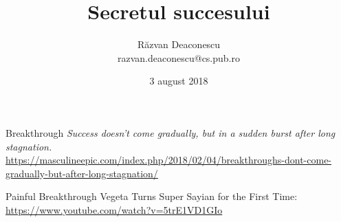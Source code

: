 \documentclass{beamer}
\title[Secretul succesului]{Secretul succesului}
\institute{InfoEducație 2018 (Gălăciuc, Vrancea)}
\author[Răzvan Deaconescu]{Răzvan Deaconescu \\
razvan.deaconescu@cs.pub.ro}
\date{3 august 2018}
\begin{document}
\frame{\titlepage}

%

\begin{frame}{Breakthrough}
  \centering
  \textit{Success doesn't come gradually, but in a sudden burst after long stagnation.}\\
  \vspace{3mm}
  \tiny{\url{https://masculineepic.com/index.php/2018/02/04/breakthroughs-dont-come-gradually-but-after-long-stagnation/}}
\end{frame}

\begin{frame}{Painful Breakthrough}
  \centering
  Vegeta Turns Super Sayian for the First Time: \url{https://www.youtube.com/watch?v=5trE1VD1GIo}
\end{frame}

%
%
%
%
%
%
%
%


\end{document}
